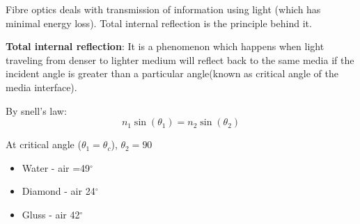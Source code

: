 \documentclass[12pt, a4paper]{article}
\begin{document}
Fibre optics deals with transmission of information using light (which has minimal energy loss). Total internal reflection is the principle behind it.

\textbf{Total internal reflection}: It is a phenomenon which happens when light traveling from denser to lighter medium will reflect back to the same media if the incident angle is greater than a particular angle(known as  critical angle of the media interface).

\begin{minipage}[t][][b]{.57\textwidth}%
	By snell's law:
	$$
		n_{1} \sin \left(\theta_{1}\right)=n_{2} \sin \left(\theta_{2}\right)
	$$

	At critical angle ($\theta_1 = \theta_c$), $\theta_{2}=90$
	\vspace{-.5cm}

	\begin{itemize}
		\item Water - air =49$^{\circ}$
		\item Diamond - air 24$^{\circ}$
		\item Gluss - air 42$^{\circ}$
	\end{itemize}
\end{minipage}%
\end{document}
